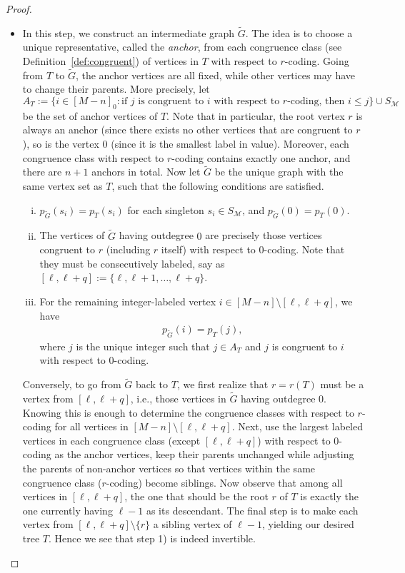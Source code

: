\documentclass[11pt,reqno]{amsart}
\numberwithin{equation}{section}
\theoremstyle{plain}
\theoremstyle{definition}
\newcommand{\M}{\mathcal{M}}
\begin{document}
\begin{proof}
\begin{itemize}
	\item[Step 1)] In this step, we construct an intermediate graph $\tilde{G}$. The idea is to choose a unique representative, called the {\em anchor}, from each congruence class (see Definition~\ref{def:congruent}) of vertices in $T$ with respect to $r$-coding. Going from $T$ to $\tilde{G}$, the anchor vertices are all fixed, while other vertices may have to change their parents. More precisely, let
	$$A_T:=\{i\in[M-n]_0: \text{if $j$ is congruent to $i$ with respect to $r$-coding, then $i\le j$}\}\cup S_{\M}$$
	be the set of anchor vertices of $T$. Note that in particular, the root vertex $r$ is always an anchor (since there exists no other vertices that are congruent to $r$), so is the vertex $0$ (since it is the smallest label in value). Moreover, each congruence class with respect to $r$-coding contains exactly one anchor, and there are $n+1$ anchors in total. Now let $\tilde{G}$ be the unique graph with the same vertex set as $T$, such that the following conditions are satisfied.
	\begin{enumerate}[(i)]
	\item $p_{\tilde{G}}(s_i)=p_T(s_i)$ for each singleton $s_i\in S_{\M}$, and $p_{\tilde{G}}(0)=p_T(0)$.
	\item The vertices of $\tilde{G}$ having outdegree $0$ are precisely those vertices congruent to $r$ (including $r$ itself) with respect to $0$-coding. Note that they must be consecutively labeled, say as $[\ell,\ell+q]:=\{\ell,\ell+1,\ldots,\ell+q\}$.
	\item For the remaining integer-labeled vertex $i\in[M-n]\setminus [\ell,\ell+q]$, we have
	\begin{align*} %
	p_{\tilde{G}}(i)=p_T(j),
	\end{align*}
	where $j$ is the unique integer such that $j\in A_T$ and $j$ is congruent to $i$ with respect to $0$-coding. 
	\end{enumerate}
	Conversely, to go from $\tilde{G}$ back to $T$, we first realize that $r=r(T)$ must be a vertex from $[\ell,\ell+q]$, i.e., those vertices in $\tilde{G}$ having outdegree $0$. Knowing this is enough to determine the congruence classes with respect to $r$-coding for all vertices in $[M-n]\setminus [\ell,\ell+q]$. Next, use the largest labeled vertices in each congruence class (except $[\ell,\ell+q]$) with respect to $0$-coding as the anchor vertices, keep their parents unchanged while adjusting the parents of non-anchor vertices so that vertices within the same congruence class ($r$-coding) become siblings. Now observe that among all vertices in $[\ell,\ell+q]$, the one that should be the root $r$ of $T$ is exactly the one currently having $\ell-1$ as its descendant. The final step is to make each vertex from $[\ell,\ell+q]\setminus\{r\}$ a sibling vertex of $\ell-1$, yielding our desired tree $T$. Hence we see that step 1) is indeed invertible.

\end{itemize}
\end{proof}
\end{document}
